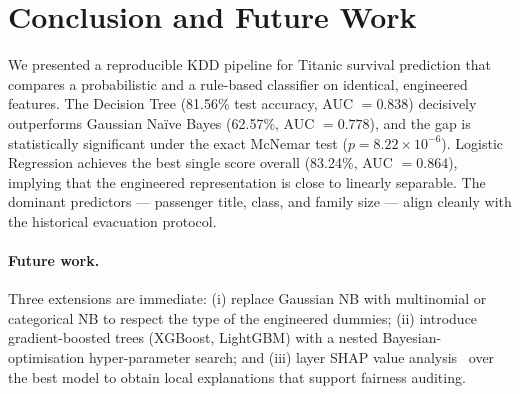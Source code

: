 \documentclass[10pt,a4paper,twocolumn]{article}
\begin{document}
\section{Conclusion and Future Work}\label{sec:conclusion}
We presented a reproducible KDD pipeline for Titanic survival prediction that compares a
probabilistic and a rule-based classifier on identical, engineered features. The Decision
Tree (81.56\% test accuracy, AUC $= 0.838$) decisively outperforms Gaussian Na\"ive Bayes
(62.57\%, AUC $= 0.778$), and the gap is statistically significant under the exact
McNemar test ($p = 8.22\times 10^{-6}$). Logistic Regression achieves the best single
score overall (83.24\%, AUC $= 0.864$), implying that the engineered representation is
close to linearly separable. The dominant predictors --- passenger title, class, and
family size --- align cleanly with the historical evacuation protocol.

\paragraph{Future work.} Three extensions are immediate: (i) replace Gaussian NB with
multinomial or categorical NB to respect the type of the engineered dummies;
(ii) introduce gradient-boosted trees (XGBoost, LightGBM) with a nested
Bayesian-optimisation hyper-parameter search; and (iii) layer SHAP value
analysis~\cite{lundberg2017shap} over the best model to obtain local explanations
that support fairness auditing.

\FloatBarrier
\newpage
\null\vspace{-\baselineskip}

\end{document}
